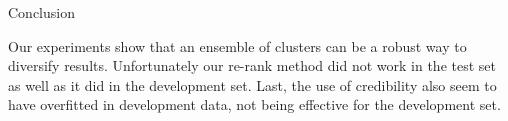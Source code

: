 \begin{section}{Conclusion}

Our experiments show that an ensemble of clusters can be a robust way to diversify results.
Unfortunately our re-rank method did not work in the test set as well as it did in the development set.
Last, the use of credibility also seem to have overfitted in development data, not being effective for the development set.

\end{section}
